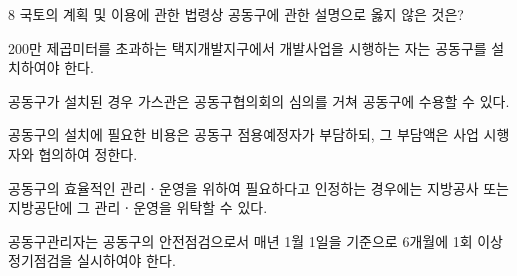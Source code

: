 \begin{question}{8}
국토의 계획 및 이용에 관한 법령상 공동구에 관한 설명으로 옳지 않은 것은?
\begin{choices}
  \item 200만 제곱미터를 초과하는 택지개발지구에서 개발사업을 시행하는 자는 공동구를 설치하여야 한다.
  \item 공동구가 설치된 경우 가스관은 공동구협의회의 심의를 거쳐 공동구에 수용할 수 있다.
  \item 공동구의 설치에 필요한 비용은 공동구 점용예정자가 부담하되, 그 부담액은 사업 시행자와 협의하여 정한다.
  \item 공동구의 효율적인 관리ㆍ운영을 위하여 필요하다고 인정하는 경우에는 지방공사 또는 지방공단에 그 관리ㆍ운영을 위탁할 수 있다.
  \item 공동구관리자는 공동구의 안전점검으로서 매년 1월 1일을 기준으로 6개월에 1회 이상 정기점검을 실시하여야 한다.
\end{choices}
\end{question}
